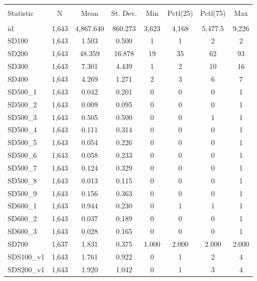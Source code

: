 
\begin{table}[!htbp] \centering 
  \caption{} 
  \label{} 
\begin{tabular}{@{\extracolsep{5pt}}lccccccc} 
\\[-1.8ex]\hline 
\hline \\[-1.8ex] 
Statistic & \multicolumn{1}{c}{N} & \multicolumn{1}{c}{Mean} & \multicolumn{1}{c}{St. Dev.} & \multicolumn{1}{c}{Min} & \multicolumn{1}{c}{Pctl(25)} & \multicolumn{1}{c}{Pctl(75)} & \multicolumn{1}{c}{Max} \\ 
\hline \\[-1.8ex] 
id & 1,643 & 4,867.640 & 860.273 & 3,623 & 4,168 & 5,477.5 & 9,226 \\ 
SD100 & 1,643 & 1.503 & 0.500 & 1 & 1 & 2 & 2 \\ 
SD200 & 1,643 & 48.359 & 16.878 & 19 & 35 & 62 & 93 \\ 
SD300 & 1,643 & 7.301 & 4.439 & 1 & 2 & 10 & 16 \\ 
SD400 & 1,643 & 4.269 & 1.271 & 2 & 3 & 6 & 7 \\ 
SD500\_1 & 1,643 & 0.042 & 0.201 & 0 & 0 & 0 & 1 \\ 
SD500\_2 & 1,643 & 0.009 & 0.095 & 0 & 0 & 0 & 1 \\ 
SD500\_3 & 1,643 & 0.505 & 0.500 & 0 & 0 & 1 & 1 \\ 
SD500\_4 & 1,643 & 0.111 & 0.314 & 0 & 0 & 0 & 1 \\ 
SD500\_5 & 1,643 & 0.054 & 0.226 & 0 & 0 & 0 & 1 \\ 
SD500\_6 & 1,643 & 0.058 & 0.233 & 0 & 0 & 0 & 1 \\ 
SD500\_7 & 1,643 & 0.124 & 0.329 & 0 & 0 & 0 & 1 \\ 
SD500\_8 & 1,643 & 0.013 & 0.115 & 0 & 0 & 0 & 1 \\ 
SD500\_9 & 1,643 & 0.156 & 0.363 & 0 & 0 & 0 & 1 \\ 
SD600\_1 & 1,643 & 0.944 & 0.230 & 0 & 1 & 1 & 1 \\ 
SD600\_2 & 1,643 & 0.037 & 0.189 & 0 & 0 & 0 & 1 \\ 
SD600\_3 & 1,643 & 0.028 & 0.165 & 0 & 0 & 0 & 1 \\ 
SD700 & 1,637 & 1.831 & 0.375 & 1.000 & 2.000 & 2.000 & 2.000 \\ 
SDS100\_v1 & 1,643 & 1.761 & 0.922 & 0 & 1 & 2 & 4 \\ 
SDS200\_v1 & 1,643 & 1.920 & 1.042 & 0 & 1 & 3 & 4 \\ 

\end{tabular}
\end{table}
